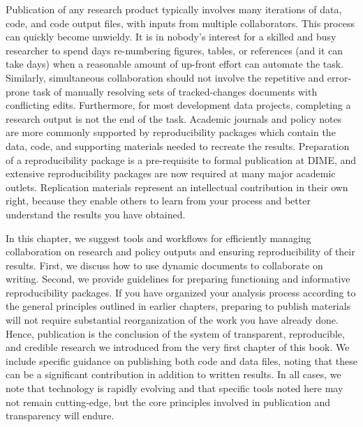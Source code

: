 
\begin{fullwidth}
Publication of any research product typically involves many iterations of
data, code, and code output files, with inputs from multiple collaborators.
This process can quickly become unwieldy.
It is in nobody's interest for a skilled and busy researcher
to spend days re-numbering figures, tables, or references (and it can take days)
when a reasonable amount of up-front effort can automate the task.
Similarly, simultaneous collaboration should not involve
the repetitive and error-prone task of manually resolving
sets of tracked-changes documents with conflicting edits.
Furthermore, for most development data projects,
completing a research output is not the end of the task.
Academic journals and policy notes are more commonly supported by
reproducibility packages which contain the data, code, and supporting materials
needed to recreate the results.
Preparation of a reproducibility package is a pre-requisite
to formal publication at DIME,
and extensive reproducibility packages are now required at many major academic outlets.
Replication materials represent an intellectual contribution in their own right,
because they enable others to learn from your process
and better understand the results you have obtained.

In this chapter, we suggest tools and workflows for
efficiently managing collaboration on research and policy outputs
and ensuring reproducibility of their results.
First, we discuss how to use dynamic documents to collaborate on writing.
Second, we provide guidelines for preparing
functioning and informative reproducibility packages.
If you have organized your analysis process
according to the general principles outlined in earlier chapters,
preparing to publish materials will not require
substantial reorganization of the work you have already done.
Hence, publication is the conclusion of the system
of transparent, reproducible, and credible research we introduced
from the very first chapter of this book.
We include specific guidance on publishing both code and data files,
noting that these can be a significant contribution in addition to written results.
In all cases, we note that technology is rapidly evolving
and that specific tools noted here may not remain cutting-edge,
but the core principles involved in publication and transparency will endure.
\end{fullwidth}


